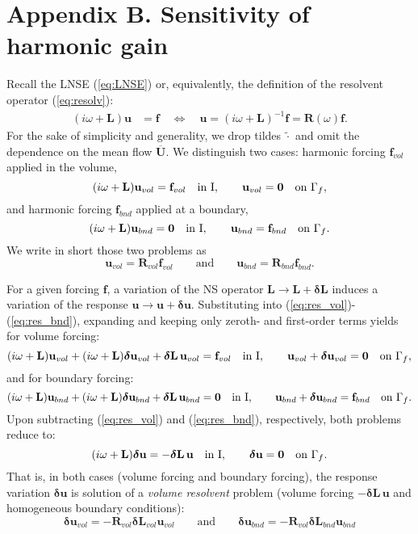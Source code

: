 \documentclass[11pt,onecolumn]{article}
\def\be{\begin{equation}}
\def\ee{\end{equation}}
\def\ff {\mathbf{f}}
\def\LL{\mathbf{L}}
\def\RR{\mathbf{R}}
\def\uu {\mathbf{u}}
\def\UUm{\overline{\mathbf{U}}}
\def\zzz {\mathbf{0}}
\def\dom    {{\mbox{I}}}
\providecommand\bdelta{\boldsymbol{\delta}}\providecommand\bnabla{\boldsymbol{\nabla}}
\begin{document}
\section*{Appendix B. Sensitivity of harmonic gain}

Recall the LNSE  (\ref{eq:LNSE}) or, equivalently, the definition of the resolvent operator (\ref{eq:resolv}):
\begin{align}
(i \omega + \LL) \uu &=
\ff
\quad 
\Leftrightarrow
\quad
\uu 
= (i \omega + \LL)^{-1}\ff
= \RR(\omega) \ff.
\label{eq:LNSE3}
\end{align}
For the sake of simplicity and generality,
 we drop tildes $\widetilde\cdot$ and omit the dependence on the mean flow $\UUm$.
%
We distinguish two cases:  harmonic forcing $\ff_{vol}$ applied in the volume,
\be
(i \omega + \LL) \uu_{vol} = \ff_{vol} \quad\mbox{in \dom},
\qquad
\uu_{vol} = \zzz  \quad\mbox{on } \Gamma_f, 
\label{eq:res_vol}
\ee
and harmonic forcing $\ff_{bnd}$  applied at a boundary,
\be
(i \omega + \LL) \uu_{bnd} = \zzz \quad\mbox{in \dom},
\qquad
\uu_{bnd} = \ff_{bnd}  \quad\mbox{on } \Gamma_f.
\label{eq:res_bnd}
\ee
We write in short those two problems as
\be 
\uu_{vol} = \RR_{vol} \ff_{vol}
\qquad \mbox{and} \qquad
\uu_{bnd} = \RR_{bnd} \ff_{bnd}.
\ee

For a given forcing $\ff$, a variation of the  NS operator  $\LL \rightarrow \LL+\bdelta\LL$ induces a variation of the response $\uu \rightarrow \uu+\bdelta\uu$.
Substituting into (\ref{eq:res_vol})-(\ref{eq:res_bnd}), expanding and keeping only zeroth- and first-order terms yields  for volume forcing:
%
\be
(i \omega + \LL) \uu_{vol} 
+ (i \omega + \LL)\bdelta\uu_{vol} 
+ \bdelta\LL\,\uu_{vol}
= \ff_{vol} \quad\mbox{in \dom},
\qquad
\uu_{vol}+\bdelta\uu_{vol} = \zzz  \quad\mbox{on } \Gamma_f,
\ee
%
and for boundary forcing:
\be
(i \omega + \LL) \uu_{bnd} 
+ (i \omega + \LL)\bdelta\uu_{bnd} 
+ \bdelta\LL\,\uu_{bnd}
= \zzz \quad\mbox{in \dom},
\qquad
\uu_{bnd} + \bdelta\uu_{bnd} = \ff_{bnd}  \quad\mbox{on } \Gamma_f. 
\ee
%
Upon subtracting (\ref{eq:res_vol}) and (\ref{eq:res_bnd}), respectively, both problems reduce to:
\be
(i \omega + \LL)\bdelta\uu = -\bdelta\LL\,\uu
\quad\mbox{in \dom},
\qquad
\bdelta\uu = \zzz  \quad\mbox{on } \Gamma_f. 
\ee
That is, in both cases (volume forcing and boundary forcing), 
the response variation $\bdelta\uu$ is solution of a \textit{volume resolvent} problem (volume forcing $-\bdelta\LL\,\uu$ and homogeneous boundary conditions):
\be
\bdelta\uu_{vol} 
= - \RR_{vol} \bdelta\LL_{vol} \uu_{vol}
\qquad \mbox{and} \qquad
\bdelta\uu_{bnd} 
= - \RR_{vol} \bdelta\LL_{bnd} \uu_{bnd}
\label{eq:du_vol_bnd}
\ee
\end{document}
